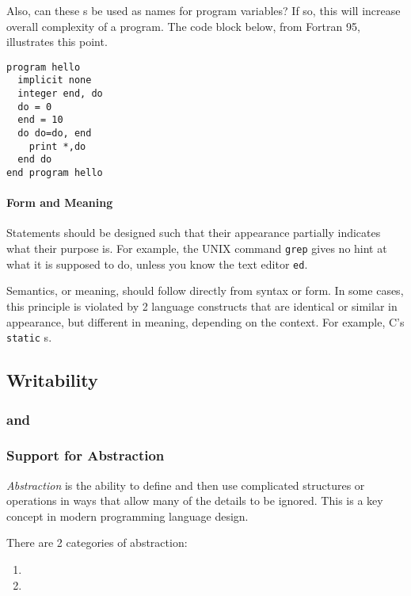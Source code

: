 Also, can these s be used as names for program variables?
If so, this will increase overall complexity of a program.
The code block below, from Fortran 95, illustrates this point.
\begin{verbatim}
program hello
  implicit none
  integer end, do
  do = 0
  end = 10
  do do=do, end
    print *,do
  end do
end program hello
\end{verbatim}

\paragraph{Form and Meaning}\label{par:Syntax_Form_Meaning}
Statements should be designed such that their appearance partially indicates what their purpose is.
For example, the UNIX command \texttt{grep} gives no hint at what it is supposed to do, unless you know the text editor \texttt{ed}.

Semantics, or meaning, should follow directly from syntax or form.
In some cases, this principle is violated by 2 language constructs that are identical or similar in appearance, but different in meaning, depending on the context.
For example, C's \texttt{static} s.

\subsection{Writability}\label{subsec:Writability}
\subsubsection{ and }\label{subsubsec:Written_Simplicity_Orthogonality}
\subsubsection{Support for Abstraction}\label{subsubsec:Abstraction_Support}
\begin{definition}[Abstraction]\label{def:Abstraction}
  \emph{Abstraction} is the ability to define and then use complicated structures or operations in ways that allow many of the details to be ignored.
  This is a key concept in modern programming language design.

  There are 2 categories of abstraction:
  \begin{enumerate}[noitemsep]
  \item {}
  \item {}
  \end{enumerate}
\end{definition}

